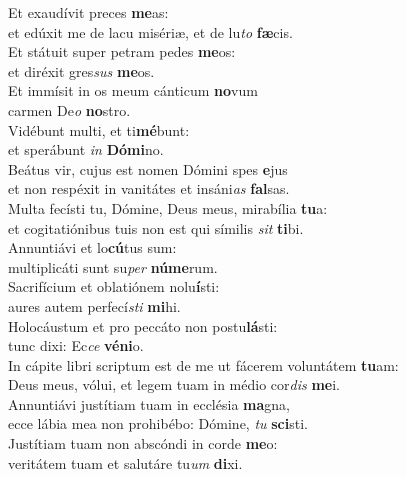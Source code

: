 \evenverse Et exaudívit preces \textbf{me}as:~\*\\
\evenverse et edúxit me de lacu misériæ, et de lu\textit{to} \textbf{fæ}cis.\\
\oddverse Et státuit super petram pedes \textbf{me}os:~\*\\
\oddverse et diréxit gres\textit{sus} \textbf{me}os.\\
\evenverse Et immísit in os meum cánticum \textbf{no}vum~\*\\
\evenverse carmen De\textit{o} \textbf{no}stro.\\
\oddverse Vidébunt multi, et ti\textbf{mé}bunt:~\*\\
\oddverse et sperábunt \textit{in} \textbf{Dó}\textbf{mi}no.\\
\evenverse Beátus vir, cujus est nomen Dómini spes \textbf{e}jus~\*\\
\evenverse et non respéxit in vanitátes et insáni\textit{as} \textbf{fal}sas.\\
\oddverse Multa fecísti tu, Dómine, Deus meus, mirabília \textbf{tu}a:~\*\\
\oddverse et cogitatiónibus tuis non est qui símilis \textit{sit} \textbf{ti}bi.\\
\evenverse Annuntiávi et lo\textbf{cú}tus sum:~\*\\
\evenverse multiplicáti sunt su\textit{per} \textbf{nú}\textbf{me}rum.\\
\oddverse Sacrifícium et oblatiónem nolu\textbf{í}sti:~\*\\
\oddverse aures autem perfecí\textit{sti} \textbf{mi}hi.\\
\evenverse Holocáustum et pro peccáto non postu\textbf{lá}sti:~\*\\
\evenverse tunc dixi: Ec\textit{ce} \textbf{vé}\textbf{ni}o.\\
\oddverse In cápite libri scriptum est de me ut fácerem voluntátem \textbf{tu}am:~\*\\
\oddverse Deus meus, vólui, et legem tuam in médio cor\textit{dis} \textbf{me}i.\\
\evenverse Annuntiávi justítiam tuam in ecclésia \textbf{ma}gna,~\*\\
\evenverse ecce lábia mea non prohibébo: Dómine, \textit{tu} \textbf{sci}sti.\\
\oddverse Justítiam tuam non abscóndi in corde \textbf{me}o:~\*\\
\oddverse veritátem tuam et salutáre tu\textit{um} \textbf{di}xi.\\
